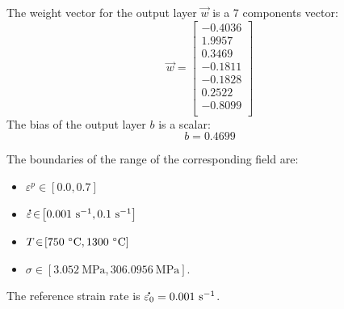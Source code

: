 \documentclass[algorithms,article,submit,pdftex,moreauthors]{Definitions/mdpi}
\DeclareRobustCommand{\mdot}[1]{\accentset{\mbox{\bfseries .}}{#1}}
\DeclareRobustCommand{\ps}{\text{s}^{-1}}
\DeclareRobustCommand{\MPa}{\text{MPa}}
\begin{document}
The weight vector for the output layer $\overrightarrow{w}$ is a 7 components vector:
\begin{equation*}
\overrightarrow{w} = \left[
\begin{array}{r}
-0.4036\\
1.9957\\
0.3469\\
-0.1811\\
-0.1828\\
0.2522\\
-0.8099\\
\end{array}\right]
\end{equation*}
The bias of the output layer $b$ is a scalar:
\begin{equation*}
b = 0.4699
\end{equation*}

The boundaries of the range of the corresponding field are:
\begin{itemize}
\item $\varepsilon^p\!\in\!\left[0.0,0.7\right]$
\item $\mdot{\varepsilon}\!\in\!\left[0.001~\ps,0.1~\ps\right]$
\item $T\!\in\!\left[750~\celsius,1300~\celsius\right]$
\item $\sigma\!\in\!\left[3.052~\MPa,306.0956~\MPa\right]$.
\end{itemize}
The reference strain rate is $\mdot{\varepsilon_0} = 0.001~\ps$.








%


\end{document}
